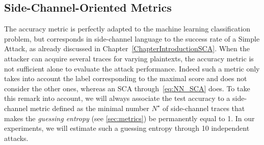 \subsection{Side-Channel-Oriented Metrics} The accuracy metric is perfectly adapted to the machine learning classification problem, but corresponds in side-channel language to the success rate of a Simple Attack, as already discussed in Chapter~\ref{ChapterIntroductionSCA}. When the attacker can acquire several traces for varying plaintexts, the accuracy metric is not sufficient alone to evaluate the attack performance.
Indeed such a metric only takes into account the label corresponding to the maximal score and does not consider the other ones, whereas an SCA through~\eqref{eq:NN_SCA} does. To take this remark into account, we will always associate the test accuracy to a side-channel metric defined as the minimal number  $N^\star$ of side-channel traces that makes the \emph{guessing entropy} (see \ref{sec:metrics}) be permanently equal to 1. In our experiments, we will estimate such a guessing entropy through 10 independent attacks. \\
%
%




